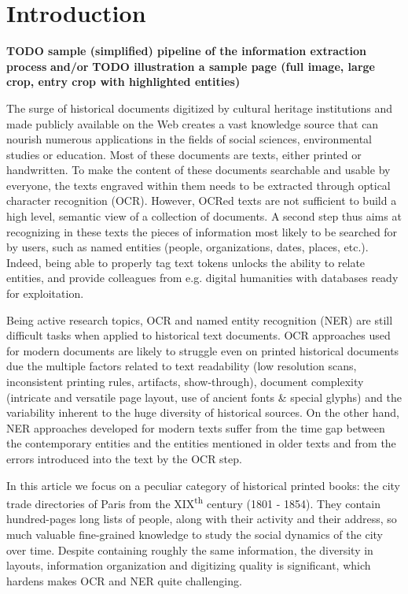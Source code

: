 \section{Introduction}

\textbf{TODO sample (simplified) pipeline of the information extraction process}
\textbf{and/or}
\textbf{TODO illustration a sample page (full image, large crop, entry crop with highlighted entities)}

The surge of historical documents digitized by cultural heritage institutions and made publicly available on the Web creates a vast knowledge source that can nourish numerous applications in the fields of social sciences, environmental studies or education.
Most of these documents are texts, either printed or handwritten.
To make the content of these documents searchable and usable by everyone, the texts engraved within them needs to be extracted through optical character recognition (OCR). 
However, OCRed texts are not sufficient to build a high level, semantic view of a collection of documents. A second step thus aims at recognizing in these texts the pieces of information most likely to be searched for by users, such as named entities (people, organizations, dates, places, etc.). Indeed, being able to properly tag text tokens unlocks the ability to relate entities, and provide colleagues from e.g. digital humanities with databases ready for exploitation.

Being active research topics, OCR and named entity recognition (NER) are still difficult tasks when applied to historical text documents.
OCR approaches used for modern documents are likely to struggle even on printed historical documents due the multiple factors related to text readability (low resolution scans, inconsistent printing rules, artifacts, show-through), document complexity (intricate and versatile page layout, use of ancient fonts \& special glyphs) and the variability inherent to the huge diversity of historical sources.
On the other hand, NER approaches developed for modern texts suffer from the time gap between the contemporary entities and the entities mentioned in older texts and from the errors introduced into the text by the OCR step.

In this article we focus on a peculiar category of historical printed books: the city trade directories of Paris from the XIX\textsuperscript{th} century (1801 - 1854).
They contain hundred-pages long lists of people, along with their activity and their address, so much valuable fine-grained knowledge to study the social dynamics of the city over time.
Despite containing roughly the same information, the diversity in layouts, information organization and digitizing quality is significant, which hardens makes OCR and NER quite challenging.

